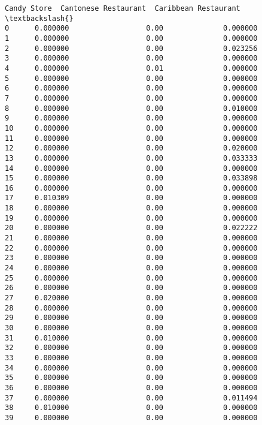 \documentclass[11pt]{article}
\begin{document}
\begin{tcolorbox}[breakable, size=fbox, boxrule=.5pt, pad at break*=1mm, opacityfill=0]
\begin{Verbatim}[commandchars=\\\{\}]
    Candy Store  Cantonese Restaurant  Caribbean Restaurant  \textbackslash{}
0      0.000000                  0.00              0.000000
1      0.000000                  0.00              0.000000
2      0.000000                  0.00              0.023256
3      0.000000                  0.00              0.000000
4      0.000000                  0.01              0.000000
5      0.000000                  0.00              0.000000
6      0.000000                  0.00              0.000000
7      0.000000                  0.00              0.000000
8      0.000000                  0.00              0.010000
9      0.000000                  0.00              0.000000
10     0.000000                  0.00              0.000000
11     0.000000                  0.00              0.000000
12     0.000000                  0.00              0.020000
13     0.000000                  0.00              0.033333
14     0.000000                  0.00              0.000000
15     0.000000                  0.00              0.033898
16     0.000000                  0.00              0.000000
17     0.010309                  0.00              0.000000
18     0.000000                  0.00              0.000000
19     0.000000                  0.00              0.000000
20     0.000000                  0.00              0.022222
21     0.000000                  0.00              0.000000
22     0.000000                  0.00              0.000000
23     0.000000                  0.00              0.000000
24     0.000000                  0.00              0.000000
25     0.000000                  0.00              0.000000
26     0.000000                  0.00              0.000000
27     0.020000                  0.00              0.000000
28     0.000000                  0.00              0.000000
29     0.000000                  0.00              0.000000
30     0.000000                  0.00              0.000000
31     0.010000                  0.00              0.000000
32     0.000000                  0.00              0.000000
33     0.000000                  0.00              0.000000
34     0.000000                  0.00              0.000000
35     0.000000                  0.00              0.000000
36     0.000000                  0.00              0.000000
37     0.000000                  0.00              0.011494
38     0.010000                  0.00              0.000000
39     0.000000                  0.00              0.000000


\end{Verbatim}
\end{tcolorbox}
\end{document}
